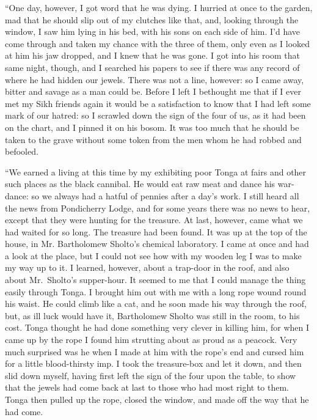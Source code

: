 \documentclass[12pt,english,oneside]{book}
\begin{document}
{}``One day, however, I got word that he was dying. I hurried at
once to the garden, mad that he should slip out of my clutches like
that, and, looking through the window, I saw him lying in his bed,
with his sons on each side of him. I'd have come through and taken
my chance with the three of them, only even as I looked at him his
jaw dropped, and I knew that he was gone. I got into his room that
same night, though, and I searched his papers to see if there was
any record of where he had hidden our jewels. There was not a line,
however: so I came away, bitter and savage as a man could be. Before
I left I bethought me that if I ever met my Sikh friends again it
would be a satisfaction to know that I had left some mark of our hatred:
so I scrawled down the sign of the four of us, as it had been on the
chart, and I pinned it on his bosom. It was too much that he should
be taken to the grave without some token from the men whom he had
robbed and befooled.

{}``We earned a living at this time by my exhibiting poor Tonga at
fairs and other such places as the black cannibal. He would eat raw
meat and dance his war-dance: so we always had a hatful of pennies
after a day's work. I still heard all the news from Pondicherry Lodge,
and for some years there was no news to hear, except that they were
hunting for the treasure. At last, however, came what we had waited
for so long. The treasure had been found. It was up at the top of
the house, in Mr. Bartholomew Sholto's chemical laboratory. I came
at once and had a look at the place, but I could not see how with
my wooden leg I was to make my way up to it. I learned, however, about
a trap-door in the roof, and also about Mr.\ Sholto's supper-hour.
It seemed to me that I could manage the thing easily through Tonga.
I brought him out with me with a long rope wound round his waist.
He could climb like a cat, and he soon made his way through the roof,
but, as ill luck would have it, Bartholomew Sholto was still in the
room, to his cost. Tonga thought he had done something very clever
in killing him, for when I came up by the rope I found him strutting
about as proud as a peacock. Very much surprised was he when I made
at him with the rope's end and cursed him for a little blood-thirsty
imp. I took the treasure-box and let it down, and then slid down myself,
having first left the sign of the four upon the table, to show that
the jewels had come back at last to those who had most right to them.
Tonga then pulled up the rope, closed the window, and made off the
way that he had come.
\end{document}
